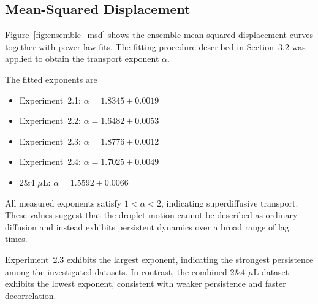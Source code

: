 \subsection{Mean-Squared Displacement}

Figure~\ref{fig:ensemble_msd} shows the ensemble mean-squared displacement curves together with power-law fits. The fitting procedure described in Section~3.2 was applied to obtain the transport exponent $\alpha$.

The fitted exponents are

\begin{itemize}
\item Experiment~2.1: $\alpha = 1.8345 \pm 0.0019$
\item Experiment~2.2: $\alpha = 1.6482 \pm 0.0053$
\item Experiment~2.3: $\alpha = 1.8776 \pm 0.0012$
\item Experiment~2.4: $\alpha = 1.7025 \pm 0.0049$
\item 2\&4 $\mu$L: $\alpha = 1.5592 \pm 0.0066$
\end{itemize}

All measured exponents satisfy $1 < \alpha < 2$, indicating superdiffusive transport. These values suggest that the droplet motion cannot be described as ordinary diffusion and instead exhibits persistent dynamics over a broad range of lag times.

Experiment~2.3 exhibits the largest exponent, indicating the strongest persistence among the investigated datasets. In contrast, the combined 2\&4 $\mu$L dataset exhibits the lowest exponent, consistent with weaker persistence and faster decorrelation.




